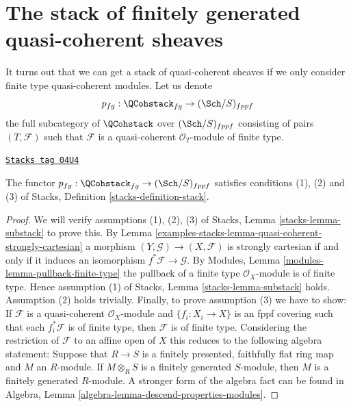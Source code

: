 \section{The stack of finitely generated quasi-coherent sheaves}
\label{examples-stacks-section-stack-of-finitely-generated-quasi-coherent-sheaves}
It turns out that we can get a stack of quasi-coherent sheaves
if we only consider finite type quasi-coherent modules.
Let us denote
$$
p_{fg} : \QCohstack_{fg} \to (\Sch/S)_{fppf}
$$
the full subcategory of $\QCohstack$ over $(\Sch/S)_{fppf}$
consisting of pairs $(T, \mathcal{F})$ such that $\mathcal{F}$
is a quasi-coherent $\mathcal{O}_T$-module of finite type.

\begin{lemma}
\label{examples-stacks-lemma-stack-of-finite-type-quasi-coherent-sheaves}
\href{https://stacks.math.columbia.edu/tag/04U4}{\texttt{Stacks tag 04U4}}

The functor $p_{fg} : \QCohstack_{fg} \to (\Sch/S)_{fppf}$
satisfies conditions (1), (2) and (3) of
Stacks, Definition \ref{stacks-definition-stack}.
\end{lemma}

\begin{proof}
We will verify assumptions (1), (2), (3) of
Stacks, Lemma \ref{stacks-lemma-substack}
to prove this. By
Lemma \ref{examples-stacks-lemma-quasi-coherent-strongly-cartesian}
a morphism $(Y, \mathcal{G}) \to (X, \mathcal{F})$ is
strongly cartesian if and only if it induces an isomorphism
$f^*\mathcal{F} \to \mathcal{G}$. By
Modules, Lemma \ref{modules-lemma-pullback-finite-type}
the pullback of a finite type $\mathcal{O}_X$-module is of finite
type. Hence assumption (1) of
Stacks, Lemma \ref{stacks-lemma-substack}
holds. Assumption (2) holds trivially.
Finally, to prove assumption (3) we have to show:
If $\mathcal{F}$ is a quasi-coherent $\mathcal{O}_X$-module
and $\{f_i : X_i \to X\}$ is an fppf covering such that each
$f_i^*\mathcal{F}$ is of finite type, then $\mathcal{F}$ is of
finite type. Considering the restriction of $\mathcal{F}$ to
an affine open of $X$ this reduces to the following algebra statement:
Suppose that $R \to S$ is a finitely presented, faithfully flat ring map
and $M$ an $R$-module. If $M \otimes_R S$ is a finitely generated
$S$-module, then $M$ is a finitely generated $R$-module.
A stronger form of the algebra fact can be found in
Algebra, Lemma \ref{algebra-lemma-descend-properties-modules}.
\end{proof}

